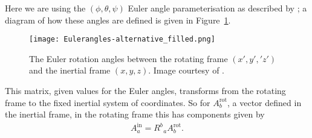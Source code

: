 \documentclass[../full_thesis/full_thesis.tex]{subfiles}
\begin{document}
Here we are using the
$(\phi, \theta, \psi)$ Euler
angle parameterisation as described by \citet{Landau1969}; a diagram of how
these angles are defined is given in Figure~\ref{fig: Euler}.\begin{figure}[ht]
\centering
\texttt{[image: Eulerangles-alternative\_filled.png]}
\caption{The Euler rotation angles between the rotating
frame $(x', y', 'z')$ and the inertial frame $(x, y, z)$. Image courtesy of
 \citet{WikipediaEuler}.}
\label{fig: Euler}
\end{figure}
This matrix, given values for the Euler angles, transforms from the rotating
frame to the fixed inertial system of coordinates. So for $A^{\textrm{rot}}_b$,
a vector defined in the inertial frame, in the rotating frame this has
components given by
\begin{align}
A^{\textrm{in}}_{a} = R^{b}_{\;\;a} A^{\textrm{rot}}_{b}.
\end{align}
\end{document}
